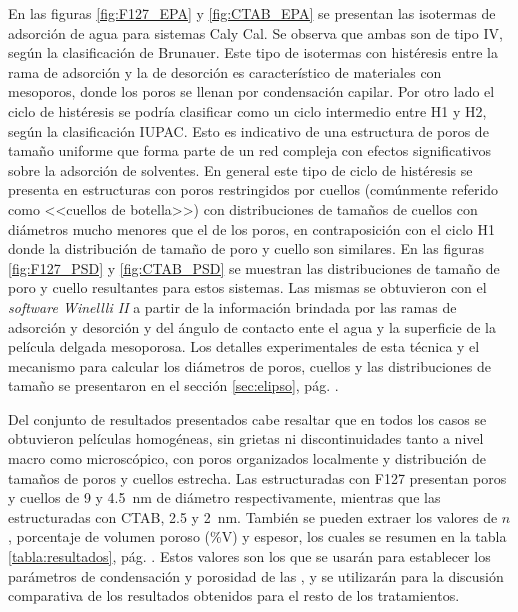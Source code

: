 		 En las figuras \ref{fig:F127_EPA} y \ref{fig:CTAB_EPA} se presentan las isotermas de adsorción de agua para sistemas Cal\pdmF\space y Cal\pdmC. Se observa que ambas son de tipo IV, según la clasificación de Brunauer\cite{Gregg1967,Violi2015,Fuertes2010}. Este tipo de isotermas con histéresis entre la rama de adsorción y la de desorción es característico de materiales con mesoporos, donde los poros se llenan por condensación capilar. Por otro lado el ciclo de histéresis se podría clasificar como un ciclo intermedio entre H1 y H2, según la clasificación IUPAC\cite{Thommes2015}. Esto es indicativo de una estructura de poros de tamaño uniforme que forma parte de un red compleja con efectos significativos sobre la adsorción de solventes.\cite{Thommes2015,Gregg1967,Lowell2004,Sing1985} En general este tipo de ciclo de histéresis se presenta en estructuras con poros restringidos por cuellos (comúnmente referido como <<cuellos de botella>>) con distribuciones de tamaños de cuellos con diámetros mucho menores que el de los poros, en contraposición con el ciclo H1 donde la distribución de tamaño de poro y cuello son similares.\cite{Thommes2015,Naumov2009} En las figuras \ref{fig:F127_PSD} y \ref{fig:CTAB_PSD} se muestran las distribuciones de tamaño de poro y cuello resultantes para estos sistemas. Las mismas se obtuvieron con el \textit{software Winellli II} a partir de la información brindada por las ramas de  adsorción y desorción y del ángulo de contacto ente el agua y la superficie de la película delgada mesoporosa. Los detalles experimentales de esta técnica y el mecanismo para calcular los diámetros de poros, cuellos y las distribuciones de tamaño se presentaron en el sección \ref{sec:elipso}, pág. \pageref{sec:elipso}.

		 Del conjunto de resultados presentados cabe resaltar que en todos los casos se obtuvieron películas homogéneas, sin grietas ni discontinuidades tanto a nivel macro como microscópico, con poros organizados localmente y distribución de tamaños de poros y cuellos estrecha. Las \pdm\space estructuradas con F127 presentan poros y cuellos de 9 y \SI{4.5}{\nm} de diámetro respectivamente, mientras que las estructuradas con CTAB, 2.5 y \SI{2}{\nm}. También se pueden extraer los valores de $n$, porcentaje de volumen poroso (\%V) y espesor, los cuales se resumen en la tabla \ref{tabla:resultados}, pág. \pageref{tabla:resultados}. Estos valores son los que se usarán para establecer los parámetros de condensación y porosidad de las \pdm, y se utilizarán para la discusión comparativa de los resultados obtenidos para el resto de los tratamientos.

